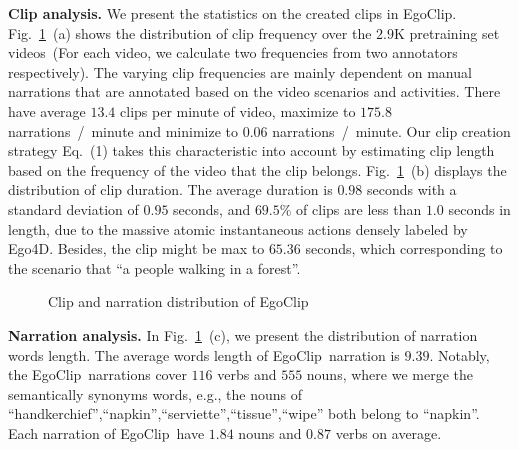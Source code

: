 \documentclass{article}
\newcommand{\dataset}{EgoClip}
\begin{document}
\noindent\textbf{Clip analysis.}
We present the statistics on the created clips in \dataset.
Fig.~\ref{fig_egoclip_clip}~(a) shows the distribution of clip frequency over the $2.9\text{K}$ pretraining set videos~(For each video, we calculate two frequencies from two annotators respectively).
The varying clip frequencies are mainly dependent on manual narrations that are annotated based on the video scenarios and activities. 
There have average $13.4$ clips per minute of video, maximize to $175.8$ narrations~/~minute and minimize to $0.06$ narrations~/~minute.
Our clip creation strategy Eq.~(1) takes this characteristic into account by estimating clip length based on the frequency of the video that the clip belongs.
Fig.~\ref{fig_egoclip_clip}~(b) displays the distribution of clip duration. 
The average duration is $0.98$ seconds with a standard deviation of $0.95$ seconds, and $69.5\%$ of clips are less than $1.0$ seconds in length, 
due to the massive atomic instantaneous actions densely labeled by Ego4D. 
Besides, the clip might be max to $65.36$ seconds, which corresponding to the scenario that ``a people walking in a forest''.

\begin{figure}[H]
\vspace{-0.5cm}
\centering
{}
\centering
\caption{Clip and narration distribution of \dataset}
\label{fig_egoclip_clip}
\vspace{-0.5cm}
\end{figure} 
\noindent\textbf{Narration analysis.}
In Fig.~\ref{fig_egoclip_clip}~(c), we present the distribution of narration words length.
The average words length of \dataset~narration is $9.39$.
Notably, the \dataset~narrations cover $116$ verbs and $555$ nouns, where we merge the semantically synonyms words, e.g., the nouns of ``handkerchief'',``napkin'',``serviette'',``tissue'',``wipe'' both belong to ``napkin''.
Each narration of \dataset~have $1.84$ nouns and $0.87$ verbs on average.
\end{document}
